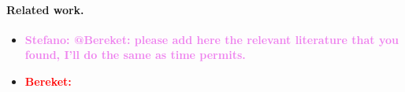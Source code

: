 \documentclass[12pt,a4paper]{article}
\newcommand{\stefano}[1]{{\bf \textcolor{violet}{{Stefano: #1}}}}
\newcommand{\bereket}[1]{{\bf \textcolor{red}{{Bereket: #1}}}}
\begin{document}
\paragraph{Related work.}

\begin{itemize}

    \item \stefano{@Bereket: please add here the  relevant literature that
        you found, I'll do the same as time permits.}
    \item \bereket{\cite{boutilier2011preference}}
\end{itemize}



\end{document}
